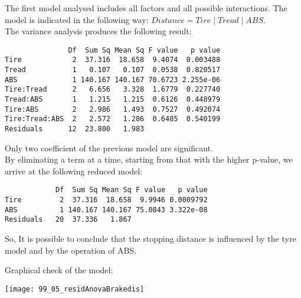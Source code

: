 \begin{frame}[fragile]
  \vspace{0.25cm}
  The first model analysed includes all factors and all possible interactions. The model is indicated in the following way:
  $ Distance = Tire \; | \; Tread \; | \; ABS $.\\
  The variance analysis produces the following result:
  \begin{verbatim}
               Df  Sum Sq Mean Sq F value   p value    
Tire            2  37.316  18.658  9.4074  0.003488
Tread           1   0.107   0.107  0.0538  0.820517    
ABS             1 140.167 140.167 70.6723 2.255e-06
Tire:Tread      2   6.656   3.328  1.6779  0.227740    
Tread:ABS       1   1.215   1.215  0.6126  0.448979    
Tire:ABS        2   2.986   1.493  0.7527  0.492074    
Tire:Tread:ABS  2   2.572   1.286  0.6485  0.540199    
Residuals      12  23.800   1.983 
  \end{verbatim}
\end{frame}

\begin{frame}[fragile]
  \vspace{0.25cm}
  Only two coefficient of the previous model are significant.\\ 
  \vspace{0.5cm}
  By eliminating a term at a time, starting from that with the higher p-value, we arrive at the following reduced model:
  \begin{verbatim}
            Df  Sum Sq Mean Sq F value   p value 
Tire         2  37.316  18.658  9.9946 0.0009792
ABS          1 140.167 140.167 75.0843 3.322e-08
Residuals   20  37.336   1.867  
  \end{verbatim}
  So, It is possible to conclude that the stopping distance is influenced by the tyre model and by the operation of ABS.
\end{frame}

\begin{frame}
   Graphical check of the model:\\
  \vspace{.1cm}
  \begin{center}
    \texttt{[image: 99\_05\_residAnovaBrakedis]}
    \end{center}
\end{frame}


